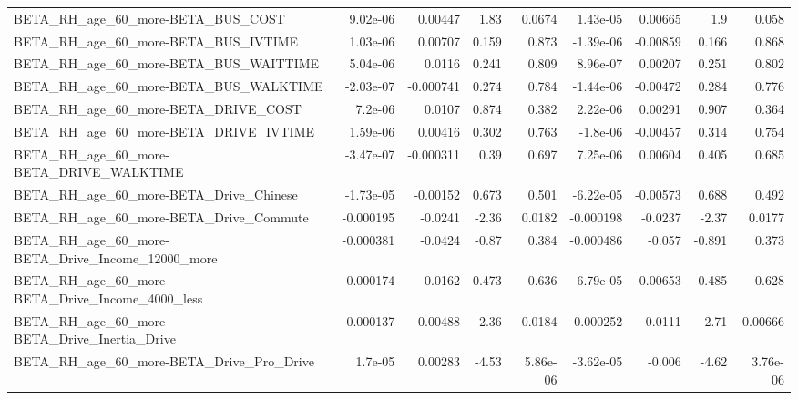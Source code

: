 \begin{tabular}{lrrrrrrrr}
BETA\_RH\_age\_60\_more-BETA\_BUS\_COST                  &    9.02e-06 &      0.00447 &     1.83 &   0.0674 &   1.43e-05 &     0.00665 &          1.9 &         0.058 \\
BETA\_RH\_age\_60\_more-BETA\_BUS\_IVTIME                &    1.03e-06 &      0.00707 &    0.159 &    0.873 &  -1.39e-06 &    -0.00859 &        0.166 &         0.868 \\
BETA\_RH\_age\_60\_more-BETA\_BUS\_WAITTIME              &    5.04e-06 &       0.0116 &    0.241 &    0.809 &   8.96e-07 &     0.00207 &        0.251 &         0.802 \\
BETA\_RH\_age\_60\_more-BETA\_BUS\_WALKTIME              &   -2.03e-07 &    -0.000741 &    0.274 &    0.784 &  -1.44e-06 &    -0.00472 &        0.284 &         0.776 \\
BETA\_RH\_age\_60\_more-BETA\_DRIVE\_COST                &     7.2e-06 &       0.0107 &    0.874 &    0.382 &   2.22e-06 &     0.00291 &        0.907 &         0.364 \\
BETA\_RH\_age\_60\_more-BETA\_DRIVE\_IVTIME              &    1.59e-06 &      0.00416 &    0.302 &    0.763 &   -1.8e-06 &    -0.00457 &        0.314 &         0.754 \\
BETA\_RH\_age\_60\_more-BETA\_DRIVE\_WALKTIME            &   -3.47e-07 &    -0.000311 &     0.39 &    0.697 &   7.25e-06 &     0.00604 &        0.405 &         0.685 \\
BETA\_RH\_age\_60\_more-BETA\_Drive\_Chinese             &   -1.73e-05 &     -0.00152 &    0.673 &    0.501 &  -6.22e-05 &    -0.00573 &        0.688 &         0.492 \\
BETA\_RH\_age\_60\_more-BETA\_Drive\_Commute             &   -0.000195 &      -0.0241 &    -2.36 &   0.0182 &  -0.000198 &     -0.0237 &        -2.37 &        0.0177 \\
BETA\_RH\_age\_60\_more-BETA\_Drive\_Income\_12000\_more   &   -0.000381 &      -0.0424 &    -0.87 &    0.384 &  -0.000486 &      -0.057 &       -0.891 &         0.373 \\
BETA\_RH\_age\_60\_more-BETA\_Drive\_Income\_4000\_less    &   -0.000174 &      -0.0162 &    0.473 &    0.636 &  -6.79e-05 &    -0.00653 &        0.485 &         0.628 \\
BETA\_RH\_age\_60\_more-BETA\_Drive\_Inertia\_Drive       &    0.000137 &      0.00488 &    -2.36 &   0.0184 &  -0.000252 &     -0.0111 &        -2.71 &       0.00666 \\
BETA\_RH\_age\_60\_more-BETA\_Drive\_Pro\_Drive           &     1.7e-05 &      0.00283 &    -4.53 & 5.86e-06 &  -3.62e-05 &      -0.006 &        -4.62 &      3.76e-06 \\

\end{tabular}
